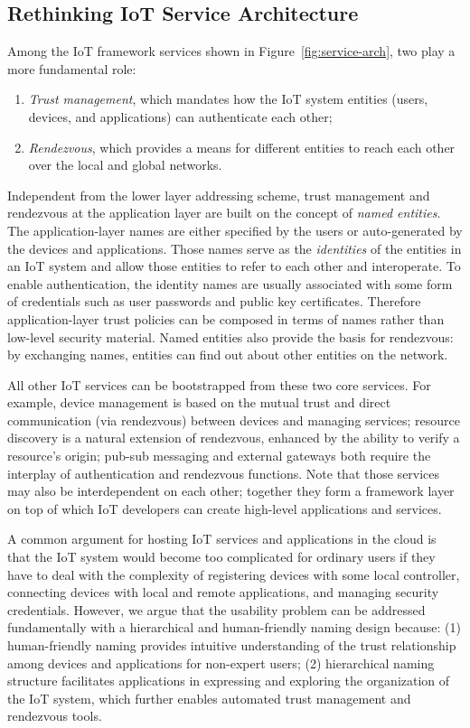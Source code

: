 \subsection{Rethinking IoT Service Architecture}

Among the IoT framework services shown in Figure~\ref{fig:service-arch}, two play a more fundamental role:
\begin{enumerate}
\item \emph{Trust management}, which mandates how the IoT system entities (users, devices, and applications) can authenticate each other;
\item \emph{Rendezvous}, which provides a means for different entities to reach each other over the local and global networks.
\end{enumerate}

Independent from the lower layer addressing scheme, trust management and rendezvous at the application layer are built on the concept of \emph{named entities}.
The application-layer names are either specified by the users or auto-generated by the devices and applications.
Those names serve as the \emph{identities} of the entities in an IoT system and allow those entities to refer to each other and interoperate.
To enable authentication, the identity names are usually associated with some form of credentials such as user passwords and public key certificates.
Therefore application-layer trust policies can be composed in terms of names rather than low-level security material.
Named entities also provide the basis for rendezvous: by exchanging names, entities can find out about other entities on the network. 

All other IoT services can be bootstrapped from these two core services.
For example, device management is based on the mutual trust and direct communication (via rendezvous) between devices and managing services;
resource discovery is a natural extension of rendezvous, enhanced by the ability to verify a resource's origin;
pub-sub messaging and external gateways both require the interplay of authentication and rendezvous functions.
Note that those services may also be interdependent on each other; together they form a framework layer on top of which IoT developers can create high-level applications and services.

A common argument for hosting IoT services and applications in the cloud is that the IoT system would become too complicated for ordinary users if they have to deal with the complexity of registering devices with some local controller, connecting devices with local and remote applications, and managing security credentials.
However, we argue that the usability problem can be addressed fundamentally with a hierarchical and human-friendly naming design because:
(1) human-friendly naming provides intuitive understanding of the trust relationship among devices and applications for non-expert users;
(2) hierarchical naming structure facilitates applications in expressing and exploring the organization of the IoT system, which further enables automated trust management and rendezvous tools.


